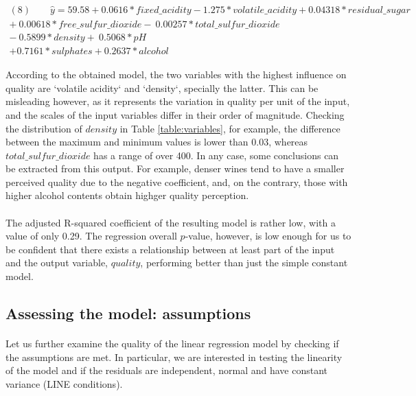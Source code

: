 \documentclass[10pt]{article}
\begin{document}
\begin{equation*}
\begin{aligned}	
(8) \ \ \ \  \ \  \ \ \  \hat{y} = 59.58 + 0.0616*fixed\_acidity  -1.275*volatile\_acidity 
+0.04318*residual\_sugar \\
+ \  0.00618*free\_sulfur\_dioxide  - \ 0.00257*total\_sulfur\_dioxide   
\\ - \ 0.5899*density  + \ 0.5068*pH   \\+ 0.7161*sulphates + 0.2637*alcohol
\end{aligned}
\end{equation*}

According to the obtained model, the two variables with the highest influence on quality are `volatile acidity` and `density`, specially the latter. This can be misleading however, as it represents the variation in quality per unit of the input, and the scales of the input variables differ in their order of magnitude. Checking the distribution of $density$ in Table \ref{table:variables}, for example, the difference between the maximum and minimum values is lower than 0.03, whereas $total\_sulfur\_dioxide$ has a range of over 400. In any case, some conclusions can be extracted from this output. For example, denser wines tend to have a smaller perceived quality due to the negative coefficient, and, on the contrary, those with higher alcohol contents obtain highger quality perception.

\paragraph*{}
The adjusted R-squared coefficient of the resulting model is rather low, with a value of only 0.29. The regression overall $p$-value, however, is low enough for us to be confident that there exists a relationship between at least part of the input and the output variable, $quality$, performing better than just the simple constant model.

\subsection{Assessing the model: assumptions}

\paragraph*{}
Let us further examine the quality of the linear regression model by checking if the assumptions are met. In particular, we are interested in testing the linearity of the model and if the residuals are independent, normal and have constant variance (LINE conditions).
\end{document}
